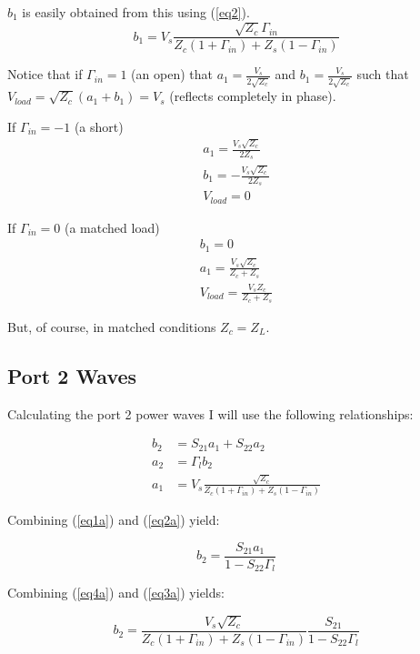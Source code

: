 $b_1$ is easily obtained from this using (\ref{eq2}). 
\begin{equation}        
b_1 = V_s \frac{\sqrt{Z_c}\Gamma_{in}}{Z_c \left( 1+\Gamma_{in} \right) +
Z_s(1-\Gamma_{in})} \label{b1}
\end{equation}

Notice that if $\Gamma_{in} = 1$ (an open) that 
$a_1 = \frac{V_s}{2 \sqrt{Z_c}}$
and 
$b_1 = \frac{V_s}{2 \sqrt{Z_c}}$ such
that 
$V_{load} = \sqrt{Z_c} (a_1+b_1) = V_s$ (reflects completely in phase).

If $\Gamma_{in} = -1$ (a short)
\begin{gather*}
    a_1 = \frac{V_s \sqrt{Z_c}}{2 Z_s} \\
    b_1 = -\frac{V_s\sqrt{Z_c}}{2Z_s} \\
    V_{load} = 0
\end{gather*}

If $\Gamma_{in} = 0$ (a matched load)
\begin{gather*}
    b_1 = 0 \\
    a_1 = \frac{V_s \sqrt{Z_c}}{Z_c + Z_s} \\
    V_{load} = \frac{V_s Z_c}{Z_c + Z_s}
\end{gather*}

But, of course, in matched conditions $Z_c = Z_L$.
\subsection*{Port 2 Waves}
Calculating the port 2 power waves I will use the following relationships:

\begin{align}
    b_2 &= S_{21}a_1 + S_{22}a_2 \label{eq1a}\\
    a_2 &= \Gamma_l b_2 \label{eq2a} \\
    a_1 &= V_s \frac{\sqrt{Z_c}}{Z_c \left( 1+\Gamma_{in} \right) + Z_s \left( 1 -
\Gamma_{in} \right)} \label{eq3a}
\end{align}

Combining (\ref{eq1a}) and (\ref{eq2a}) yield:

\begin{equation}
b_2 = \frac{S_{21}a_1}{1-S_{22}\Gamma_l} \label{eq4a}
\end{equation}

Combining (\ref{eq4a}) and (\ref{eq3a}) yields:

\begin{equation}
    b_2 =  \frac{V_s \sqrt{Z_c}}{Z_c \left( 1 + \Gamma_{in} \right) +
    Z_s(1-\Gamma_{in})}\frac{S_{21}}{1-S_{22}\Gamma_l} \label{b2}
\end{equation}

